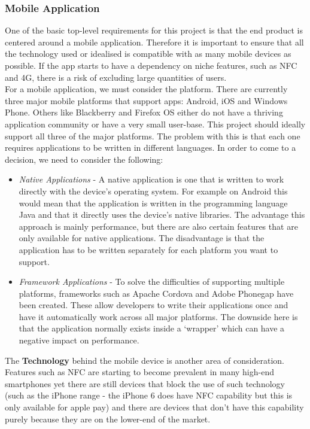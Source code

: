 \subsubsection{Mobile Application}
One of the basic top-level requirements for this project is that the end product is centered around a mobile application.  Therefore it is important to ensure that all the technology used or idealised is compatible with as many mobile devices as possible.  If the app starts to have a dependency on niche features, such as NFC and 4G, there is a risk of excluding large quantities of users.\\
For a mobile application, we must consider the platform.  There are currently three major mobile platforms that support apps: Android, iOS and Windows Phone.  Others like Blackberry and Firefox OS either do not have a thriving application community or have a very small user-base.  This project should ideally support all three of the major platforms.  The problem with this is that each one requires applications to be written in different languages.  In order to come to a decision, we need to consider the following:
\begin{itemize}
\item \emph{Native Applications} - A native application is one that is written to work directly with the device's operating system. For example on Android this would mean that the application is written in the programming language Java and that it directly uses the device's native libraries. The advantage this approach is mainly performance, but there are also certain features that are only available for native applications. The disadvantage is that the application has to be written separately for each platform you want to support.
\item \emph{Framework Applications} - To solve the difficulties of supporting multiple platforms, frameworks such as Apache Cordova and Adobe Phonegap have been created. These allow developers to write their applications once and have it automatically work across all major platforms. The downside here is that the application normally exists inside a `wrapper' which can have a negative impact on performance.
\end{itemize}
The \textbf{Technology} behind the mobile device is another area of consideration.  Features such as NFC are starting to become prevalent in many high-end smartphones yet there are still devices that block the use of such technology (such as the iPhone range - the iPhone 6 does have NFC capability but this is only available for apple pay) and there are devices that don't have this capability purely because they are on the lower-end of the market. 

